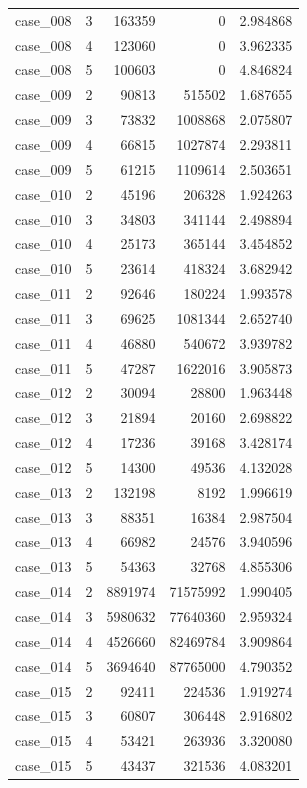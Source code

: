 \begin{longtable}{lrrrr}
case\_008 & 3 & 163359 & 0 & 2.984868 \\
case\_008 & 4 & 123060 & 0 & 3.962335 \\
case\_008 & 5 & 100603 & 0 & 4.846824 \\
case\_009 & 2 & 90813 & 515502 & 1.687655 \\
case\_009 & 3 & 73832 & 1008868 & 2.075807 \\
case\_009 & 4 & 66815 & 1027874 & 2.293811 \\
case\_009 & 5 & 61215 & 1109614 & 2.503651 \\
case\_010 & 2 & 45196 & 206328 & 1.924263 \\
case\_010 & 3 & 34803 & 341144 & 2.498894 \\
case\_010 & 4 & 25173 & 365144 & 3.454852 \\
case\_010 & 5 & 23614 & 418324 & 3.682942 \\
case\_011 & 2 & 92646 & 180224 & 1.993578 \\
case\_011 & 3 & 69625 & 1081344 & 2.652740 \\
case\_011 & 4 & 46880 & 540672 & 3.939782 \\
case\_011 & 5 & 47287 & 1622016 & 3.905873 \\
case\_012 & 2 & 30094 & 28800 & 1.963448 \\
case\_012 & 3 & 21894 & 20160 & 2.698822 \\
case\_012 & 4 & 17236 & 39168 & 3.428174 \\
case\_012 & 5 & 14300 & 49536 & 4.132028 \\
case\_013 & 2 & 132198 & 8192 & 1.996619 \\
case\_013 & 3 & 88351 & 16384 & 2.987504 \\
case\_013 & 4 & 66982 & 24576 & 3.940596 \\
case\_013 & 5 & 54363 & 32768 & 4.855306 \\
case\_014 & 2 & 8891974 & 71575992 & 1.990405 \\
case\_014 & 3 & 5980632 & 77640360 & 2.959324 \\
case\_014 & 4 & 4526660 & 82469784 & 3.909864 \\
case\_014 & 5 & 3694640 & 87765000 & 4.790352 \\
case\_015 & 2 & 92411 & 224536 & 1.919274 \\
case\_015 & 3 & 60807 & 306448 & 2.916802 \\
case\_015 & 4 & 53421 & 263936 & 3.320080 \\
case\_015 & 5 & 43437 & 321536 & 4.083201 \\

\end{longtable}
